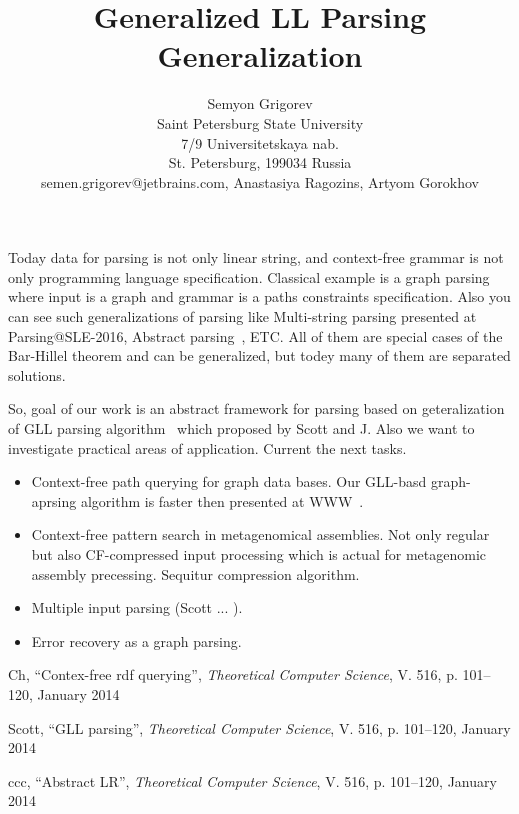 \documentclass[12pt]{article}  %
\title{Generalized LL Parsing Generalization}
\author{Semyon Grigorev
\\
       {Saint Petersburg State University}\\
       {7/9 Universitetskaya nab.}\\
       {St. Petersburg, 199034 Russia}\\
       {semen.grigorev@jetbrains.com}, 
       Anastasiya Ragozins, Artyom Gorokhov}
\theoremstyle{definition}
\theoremstyle{remark}
\begin{document}
\maketitle

Today data for parsing is not only linear string, and context-free grammar is not only programming language specification.
Classical example is a graph parsing where input is a graph and grammar is a paths constraints specification.
Also you can see such generalizations of parsing like Multi-string parsing presented at Parsing@SLE-2016, Abstract parsing~\cite{AbstractParsing}, ETC.
All of them are special cases of the Bar-Hillel theorem and can be generalized, but todey many of them are separated solutions.

So, goal of our work is an abstract framework for parsing based on geteralization of GLL parsing 
algorithm~\cite{GLL} which proposed by Scott and J. Also we want to investigate practical areas of 
application. Current the next tasks.
\begin{itemize}
\item Context-free path querying for graph data bases. 
Our GLL-basd graph-aprsing algorithm is faster then presented at WWW~\cite{CFRDFParsing}.  
\item Context-free pattern search in metagenomical assemblies. Not only regular but also CF-compressed input processing which is actual for metagenomic assembly precessing. 
Sequitur compression algorithm.
\item Multiple input parsing (Scott ... ). 
\item Error recovery as a graph parsing. 
\end{itemize}

\begin{thebibliography}{9}

  Ch,
  ``Contex-free rdf querying'',
  \emph{Theoretical Computer Science},
  V. 516,
  p. 101--120,
  January 2014

  Scott,
  ``GLL parsing'',
  \emph{Theoretical Computer Science},
  V. 516,
  p. 101--120,
  January 2014

  ccc,
  ``Abstract LR'',
  \emph{Theoretical Computer Science},
  V. 516,
  p. 101--120,
  January 2014

\end{thebibliography}
\end{document}
